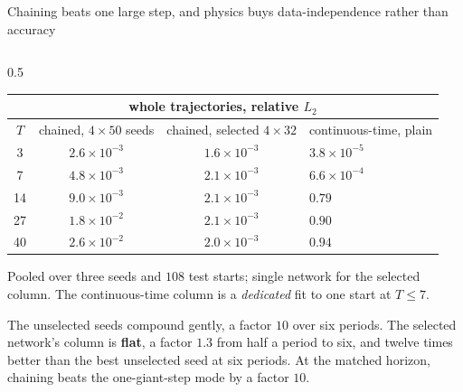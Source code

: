 \documentclass[aspectratio=169,10pt]{beamer}
\newcommand{\hl}[1]{{\color{accent}\textbf{#1}}}
\begin{document}
\begin{frame}[shrink=25]{Chaining beats one large step, and physics buys data-independence rather than accuracy}
  \vspace{1mm}
  \begin{columns}[T]
    \begin{column}{0.5\textwidth}
      \centering\scriptsize
      \begin{tabular}{@{}cccl@{}}
        \multicolumn{4}{c}{\textbf{whole trajectories, relative $L_2$}}\\
        \toprule
        $T$ & chained, $4{\times}50$ seeds & chained, selected $4{\times}32$ & continuous-time, plain \\
        \midrule
        3  & $2.6\times10^{-3}$ & $1.6\times10^{-3}$ & $3.8\times10^{-5}$ \\
        7  & $4.8\times10^{-3}$ & $2.1\times10^{-3}$ & $6.6\times10^{-4}$ \\
        14 & $9.0\times10^{-3}$ & $2.1\times10^{-3}$ & $0.79$ \\
        27 & $1.8\times10^{-2}$ & $2.1\times10^{-3}$ & $0.90$ \\
        40 & $2.6\times10^{-2}$ & $2.0\times10^{-3}$ & $0.94$ \\
        \bottomrule
      \end{tabular}
      \smallskip

      {\scriptsize Pooled over three seeds and $108$ test starts; single network
       for the selected column. The continuous-time column is a
       \emph{dedicated} fit to one start at $T \le 7$.}
      \smallskip

      {\small The unselected seeds compound gently, a factor $10$ over six
       periods. The selected network's column is \hl{flat}, a factor $1.3$ from
       half a period to six, and twelve times better than the best unselected
       seed at six periods. At the matched horizon, chaining beats the
       one-giant-step mode by a factor $10$.
       \smallskip

}
\end{column}
\end{columns}
\end{frame}
\end{document}
